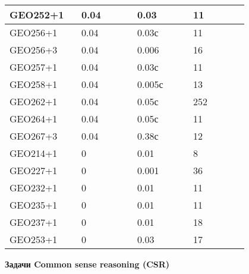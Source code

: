 \begin{longtable}[H]{|p{0.2\linewidth}|p{0.2\linewidth}|p{0.2\linewidth}|p{0.2\linewidth}|}
GEO252+1 &  0.04 &  0.03 &  11 \\
\hline
GEO256+1 &  0.04 &  0.03с &  11 \\
\hline
GEO256+3 &  0.04 &  0.006 &  16 \\
\hline
GEO257+1 &  0.04 &  0.03с &  11 \\
\hline
GEO258+1 &  0.04 &  0.005с &  13 \\
\hline
GEO262+1 &  0.04 &  0.05с &  252 \\
\hline
GEO264+1 &  0.04 &  0.05с &  11 \\
\hline
GEO267+3 &  0.04 &  0.38с &  12 \\
\hline
GEO214+1 &  0 &  0.01 &  8 \\
\hline
GEO227+1 &  0 &  0.001 &  36 \\
\hline
GEO232+1 &  0 &  0.01 &  11 \\
\hline
GEO235+1 &  0 &  0.01 &  11 \\
\hline
GEO237+1 &  0 &  0.01 &  18 \\
\hline
GEO253+1 &  0 &  0.03 &  17 \\
\hline
\end{longtable}





\textbf{Задачи Common sense reasoning (CSR)}


